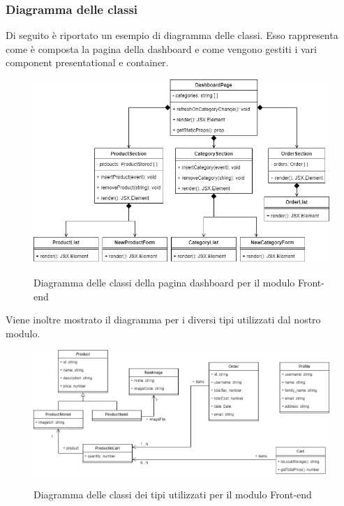 \subsubsection{Diagramma delle classi}
Di seguito è riportato un esempio di diagramma delle classi. Esso rappresenta come è composta la pagina della dashboard e come vengono gestiti i vari component presentational e container.

\vspace{1cm}

\begin{figure}[H]
\centering
\includegraphics[scale=0.55]{res/Architettura/Frontend/img/class_frontend_dashboard}\\
\caption{Diagramma delle classi della pagina dashboard per il modulo Front-end}
\end{figure}

Viene inoltre mostrato il diagramma per i diversi tipi utilizzati dal nostro modulo.

\begin{figure}[H]
\centering
\includegraphics[scale=0.45]{res/Architettura/Frontend/img/class_frontend_types}\\
\caption{Diagramma delle classi dei tipi utilizzati per il modulo Front-end}
\end{figure}